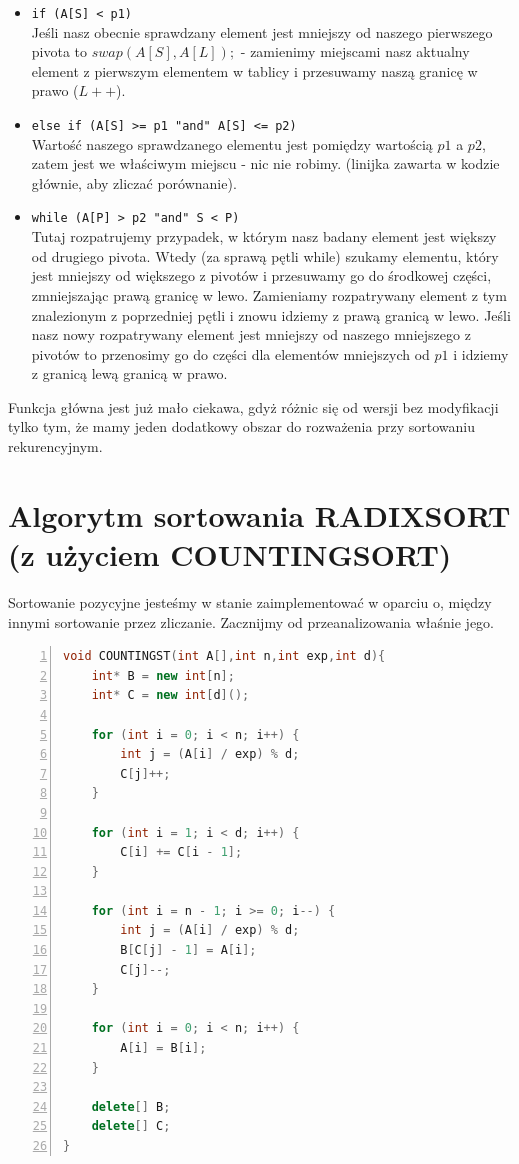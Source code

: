 \documentclass{article}
\begin{document}
\begin{itemize}
\item \texttt{if (A[S] < p1)} \\
Jeśli nasz obecnie sprawdzany element jest mniejszy od naszego pierwszego pivota to $swap(A[S], A[L]);$ - zamienimy miejscami nasz aktualny element z pierwszym elementem w tablicy i przesuwamy naszą granicę w prawo ($L++$).

\item \texttt{else if (A[S] >= p1 "and" A[S] <= p2)} \\
Wartość naszego sprawdzanego elementu jest pomiędzy wartością $p1$ a $p2$, zatem jest we właściwym miejscu - nic nie robimy. (linijka zawarta w kodzie głównie, aby zliczać porównanie).

\item \texttt{while (A[P] > p2 "and" S < P)} \\
Tutaj rozpatrujemy przypadek, w którym nasz badany element jest większy od drugiego pivota. Wtedy (za sprawą pętli while) szukamy elementu, który jest mniejszy od większego z pivotów i przesuwamy go do środkowej części, zmniejszając prawą granicę w lewo. Zamieniamy rozpatrywany element z tym znalezionym z poprzedniej pętli i znowu idziemy z prawą granicą w lewo. Jeśli nasz nowy rozpatrywany element jest mniejszy od naszego mniejszego z pivotów to przenosimy go do części dla elementów mniejszych od $p1$ i idziemy z granicą lewą granicą w prawo. 
\end{itemize} 

\large{Funkcja główna jest już mało ciekawa, gdyż różnic się od wersji bez modyfikacji tylko tym, że mamy jeden dodatkowy obszar do rozważenia przy sortowaniu rekurencyjnym. }

\newpage

\section{Algorytm sortowania RADIXSORT (z użyciem COUNTINGSORT)}

\large{Sortowanie pozycyjne jesteśmy w stanie zaimplementować w oparciu o, między innymi sortowanie przez zliczanie. Zacznijmy od przeanalizowania właśnie jego.}

\begin{lstlisting}[language=C++, caption={Kod funkcji sortowania pozycyjnego}, numbers=left, frame=single, xleftmargin=20pt]
void COUNTINGST(int A[],int n,int exp,int d){
	int* B = new int[n];
	int* C = new int[d]();
	
	for (int i = 0; i < n; i++) {
		int j = (A[i] / exp) % d;
		C[j]++;
	}
	
	for (int i = 1; i < d; i++) {
		C[i] += C[i - 1];
	}
	
	for (int i = n - 1; i >= 0; i--) {
		int j = (A[i] / exp) % d;
		B[C[j] - 1] = A[i];
		C[j]--;
	}
	
	for (int i = 0; i < n; i++) {
		A[i] = B[i];
	}
	
	delete[] B;
	delete[] C;
}

\end{lstlisting}
\end{document}
